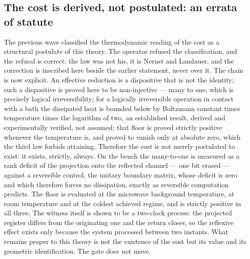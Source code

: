 \documentclass[11pt]{article}
\theoremstyle{definition}\newtheorem{deriv}{Derivation}
\begin{document}
\subsection*{The cost is derived, not postulated: an errata of statute}The previous wave classified the thermodynamic reading of the cost as a structural postulate of this theory. The operator refused the classification, and the refusal is correct: the law was not his, it is Nernst and Landauer, and the correction is inscribed here beside the earlier statement, never over it. The chain is now explicit. An effective reduction is a dispositive that is not the identity; such a dispositive is proved here to be non-injective --- many to one, which is precisely logical irreversibility; for a logically irreversible operation in contact with a bath the dissipated heat is bounded below by Boltzmann constant times temperature times the logarithm of two, an established result, derived and experimentally verified, not assumed; that floor is proved strictly positive whenever the temperature is, and proved to vanish only at absolute zero, which the third law forbids attaining. Therefore the cost is not merely postulated to exist: it exists, strictly, always. On the bench the many-to-one is measured as a rank deficit of the projection onto the reflected channel --- one bit erased --- against a reversible control, the unitary boundary matrix, whose deficit is zero and which therefore forces no dissipation, exactly as reversible computation predicts. The floor is evaluated at the microwave background temperature, at room temperature and at the coldest achieved regime, and is strictly positive in all three. The witness itself is shown to be a two-clock process: the projected register differs from the originating one and the return closes, so the reflexive effect exists only because the system processed between two instants. What remains proper to this theory is not the existence of the cost but its value and its geometric identification. The gate does not move.
\end{document}

